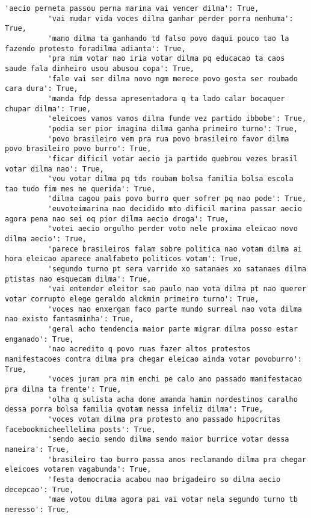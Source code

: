 \documentclass[11pt]{article}
\begin{document}
\begin{Verbatim}[commandchars=\\\{\}]
          'aecio perneta passou perna marina vai vencer dilma': True,
          'vai mudar vida voces dilma ganhar perder porra nenhuma': True,
          'mano dilma ta ganhando td falso povo daqui pouco tao la fazendo protesto foradilma adianta': True,
          'pra mim votar nao iria votar dilma pq educacao ta caos saude fala dinheiro usou abusou copa': True,
          'fale vai ser dilma novo ngm merece povo gosta ser roubado cara dura': True,
          'manda fdp dessa apresentadora q ta lado calar bocaquer chupar dilma': True,
          'eleicoes vamos vamos dilma funde vez partido ibbobe': True,
          'podia ser pior imagina dilma ganha primeiro turno': True,
          'povo brasileiro vem pra rua povo brasileiro favor dilma povo brasileiro povo burro': True,
          'ficar dificil votar aecio ja partido quebrou vezes brasil votar dilma nao': True,
          'vou votar dilma pq tds roubam bolsa familia bolsa escola tao tudo fim mes ne querida': True,
          'dilma cagou pais povo burro quer sofrer pq nao pode': True,
          'euvoteimarina nao decidido mto dificil marina passar aecio agora pena nao sei oq pior dilma aecio droga': True,
          'votei aecio orgulho perder voto nele proxima eleicao novo dilma aecio': True,
          'parece brasileiros falam sobre politica nao votam dilma ai hora eleicao aparece analfabeto politicos votam': True,
          'segundo turno pt sera varrido xo satanaes xo satanaes dilma ptistas nao esquecam dilma': True,
          'vai entender eleitor sao paulo nao vota dilma pt nao querer votar corrupto elege geraldo alckmin primeiro turno': True,
          'voces nao enxergam faco parte mundo surreal nao vota dilma nao existo fantasminha': True,
          'geral acho tendencia maior parte migrar dilma posso estar enganado': True,
          'nao acredito q povo ruas fazer altos protestos manifestacoes contra dilma pra chegar eleicao ainda votar povoburro': True,
          'voces juram pra mim enchi pe calo ano passado manifestacao pra dilma ta frente': True,
          'olha q sulista acha done amanda hamin nordestinos caralho dessa porra bolsa familia qvotam nessa infeliz dilma': True,
          'voces votam dilma pra protesto ano passado hipocritas facebookmicheellelima posts': True,
          'sendo aecio sendo dilma sendo maior burrice votar dessa maneira': True,
          'brasileiro tao burro passa anos reclamando dilma pra chegar eleicoes votarem vagabunda': True,
          'festa democracia acabou nao brigadeiro so dilma aecio decepcao': True,
          'mae votou dilma agora pai vai votar nela segundo turno tb meresso': True,

\end{Verbatim}
\end{document}
